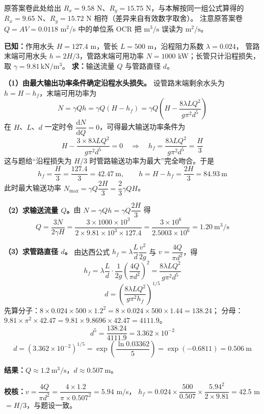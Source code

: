\begin{tishi}
原答案卷此处给出 $R_x=9.58$ N、$R_y=15.75$ N，与本解按同一组公式算得的
$R_x=9.65$ N、$R_y=15.72$ N 相符（差异来自有效数字取舍）。
注意原答案卷 $Q=AV=0.0118$ m$^2$/s 中的单位系 OCR 把 $\mathrm{m^3/s}$ 误读为 $\mathrm{m^2/s}$。
\end{tishi}


\begin{jie}
\textbf{已知：}作用水头 $H=127.4$ m，管长 $L=500$ m，沿程阻力系数 $\lambda=0.024$，
管路末端可用水头 $h=2H/3$，管路末端可用功率 $N=1000$ kW；长管只计沿程损失，取 $\gamma=9.81\,\mathrm{kN/m^3}$。
\textbf{求：}输送流量 $Q$ 与管路直径 $d$。

\textbf{（1）由最大输出功率条件确定沿程水头损失。}
设管路末端剩余水头为 $h=H-h_f$，末端可用功率为
\[
N=\gamma Qh=\gamma Q\left(H-h_f\right)
=\gamma Q\left(H-\frac{8\lambda LQ^2}{g\pi^2d^5}\right)
\]
在 $H$、$L$、$d$ 一定时令 $\dfrac{\mathrm{d}N}{\mathrm{d}Q}=0$，可得最大输送功率条件为
\[
H-\frac{3\times8\lambda LQ^2}{g\pi^2d^5}=0
\quad\Longrightarrow\quad
h_f=\frac{8\lambda LQ^2}{g\pi^2d^5}=\frac{H}{3}
\]
这与题给“沿程损失为 $H/3$ 时管路输送功率为最大”完全吻合。于是
\[
h_f=\frac{H}{3}=\frac{127.4}{3}=42.47\ \mathrm{m},
\qquad
h=H-h_f=\frac{2H}{3}=84.93\ \mathrm{m}
\]
此时最大输送功率 $N_{\max}=\gamma Q\dfrac{2H}{3}=\dfrac{2}{3}\gamma QH$。

\textbf{（2）求输送流量 $Q$。}由 $N=\gamma Qh=\gamma Q\dfrac{2H}{3}$ 得
\[
Q=\frac{3N}{2\gamma H}=\frac{3\times1000\times10^3}{2\times9.81\times10^3\times127.4}
=\frac{3\times10^6}{2.5003\times10^6}=1.20\ \mathrm{m^3/s}
\]

\textbf{（3）求管路直径 $d$。}
由达西公式 $h_f=\lambda\dfrac{L}{d}\dfrac{v^2}{2g}$ 与 $v=\dfrac{4Q}{\pi d^2}$，得
\[
h_f=\lambda\frac{L}{d}\cdot\frac{1}{2g}\left(\frac{4Q}{\pi d^2}\right)^2
=\frac{8\lambda LQ^2}{g\pi^2d^5}
\]
\[
d=\left(\frac{8\lambda LQ^2}{g\pi^2h_f}\right)^{1/5}
\]
先算分子：$8\times0.024\times500\times1.2^2=8\times0.024\times500\times1.44=138.24$；
分母：$9.81\times\pi^2\times42.47=9.81\times9.8696\times42.47=4111.9$。
\[
d^{5}=\frac{138.24}{4111.9}=3.362\times10^{-2}
\]
\[
d=\left(3.362\times10^{-2}\right)^{1/5}
=\exp\!\left(\frac{\ln 0.03362}{5}\right)=\exp(-0.6811)=0.506\ \mathrm{m}
\]

\textbf{结果：}$\boxed{Q\approx1.2\ \mathrm{m^3/s}}$，$\boxed{d\approx0.507\ \mathrm{m}}$。

\textbf{校核：}$v=\dfrac{4Q}{\pi d^2}=\dfrac{4\times1.2}{\pi\times0.507^2}=5.94$ m/s，
$h_f=0.024\times\dfrac{500}{0.507}\times\dfrac{5.94^2}{2\times9.81}=42.5$ m $=H/3$，与题设一致。
\end{jie}

